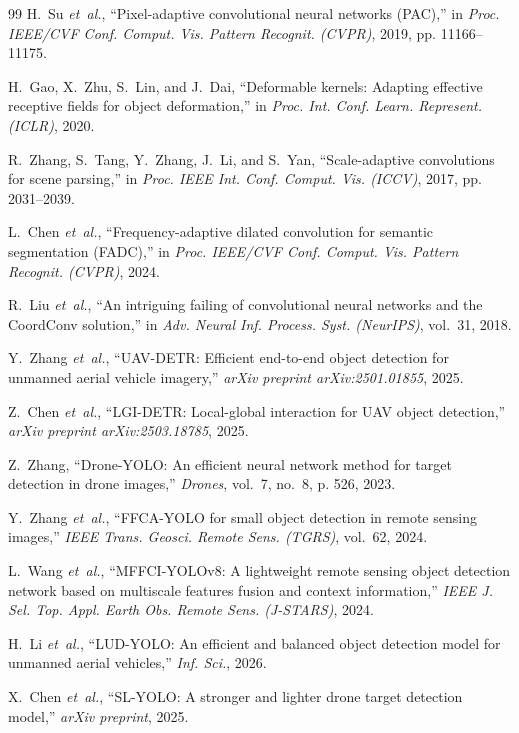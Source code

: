 \documentclass[11pt,a4paper]{article}
\begin{document}
\begin{thebibliography}{99}
H.~Su \emph{et~al.}, ``Pixel-adaptive convolutional neural networks (PAC),'' in \emph{Proc. IEEE/CVF Conf. Comput. Vis. Pattern Recognit. (CVPR)}, 2019, pp. 11166--11175.

H.~Gao, X.~Zhu, S.~Lin, and J.~Dai, ``Deformable kernels: Adapting effective receptive fields for object deformation,'' in \emph{Proc. Int. Conf. Learn. Represent. (ICLR)}, 2020.

R.~Zhang, S.~Tang, Y.~Zhang, J.~Li, and S.~Yan, ``Scale-adaptive convolutions for scene parsing,'' in \emph{Proc. IEEE Int. Conf. Comput. Vis. (ICCV)}, 2017, pp. 2031--2039.

L.~Chen \emph{et~al.}, ``Frequency-adaptive dilated convolution for semantic segmentation (FADC),'' in \emph{Proc. IEEE/CVF Conf. Comput. Vis. Pattern Recognit. (CVPR)}, 2024.

R.~Liu \emph{et~al.}, ``An intriguing failing of convolutional neural networks and the CoordConv solution,'' in \emph{Adv. Neural Inf. Process. Syst. (NeurIPS)}, vol.~31, 2018.

Y.~Zhang \emph{et~al.}, ``UAV-DETR: Efficient end-to-end object detection for unmanned aerial vehicle imagery,'' \emph{arXiv preprint arXiv:2501.01855}, 2025.

Z.~Chen \emph{et~al.}, ``LGI-DETR: Local-global interaction for UAV object detection,'' \emph{arXiv preprint arXiv:2503.18785}, 2025.

Z.~Zhang, ``Drone-YOLO: An efficient neural network method for target detection in drone images,'' \emph{Drones}, vol.~7, no.~8, p. 526, 2023.

Y.~Zhang \emph{et~al.}, ``FFCA-YOLO for small object detection in remote sensing images,'' \emph{IEEE Trans. Geosci. Remote Sens. (TGRS)}, vol.~62, 2024.

L.~Wang \emph{et~al.}, ``MFFCI-YOLOv8: A lightweight remote sensing object detection network based on multiscale features fusion and context information,'' \emph{IEEE J. Sel. Top. Appl. Earth Obs. Remote Sens. (J-STARS)}, 2024.

H.~Li \emph{et~al.}, ``LUD-YOLO: An efficient and balanced object detection model for unmanned aerial vehicles,'' \emph{Inf. Sci.}, 2026.

X.~Chen \emph{et~al.}, ``SL-YOLO: A stronger and lighter drone target detection model,'' \emph{arXiv preprint}, 2025.


\end{thebibliography}
\end{document}
